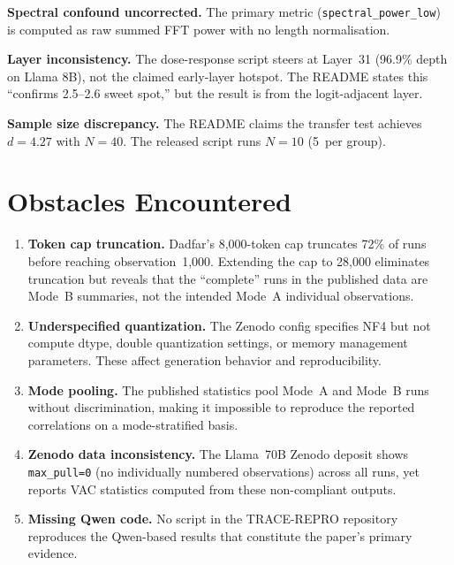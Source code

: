 \documentclass[11pt]{article}
\begin{document}
\textbf{Spectral confound uncorrected.} The primary metric
(\texttt{spectral\_power\_low}) is computed as raw summed FFT power
with no length normalisation.

\textbf{Layer inconsistency.} The dose-response script steers at
Layer~31 (96.9\% depth on Llama 8B), not the claimed early-layer
hotspot. The README states this ``confirms 2.5--2.6 sweet spot,'' but
the result is from the logit-adjacent layer.

\textbf{Sample size discrepancy.} The README claims the transfer test
achieves $d = 4.27$ with $N = 40$. The released script runs $N = 10$
(5~per group).


\section{Obstacles Encountered}

\begin{enumerate}
  \item \textbf{Token cap truncation.} Dadfar's 8,000-token cap
    truncates 72\% of runs before reaching observation~1,000. Extending
    the cap to 28,000 eliminates truncation but reveals that the
    ``complete'' runs in the published data are Mode~B summaries, not
    the intended Mode~A individual observations.

  \item \textbf{Underspecified quantization.} The Zenodo config
    specifies NF4 but not compute dtype, double quantization settings,
    or memory management parameters. These affect generation behavior
    and reproducibility.

  \item \textbf{Mode pooling.} The published statistics pool Mode~A
    and Mode~B runs without discrimination, making it impossible to
    reproduce the reported correlations on a mode-stratified basis.

  \item \textbf{Zenodo data inconsistency.} The Llama~70B Zenodo
    deposit shows \texttt{max\_pull=0} (no individually numbered
    observations) across all runs, yet reports VAC statistics computed
    from these non-compliant outputs.

  \item \textbf{Missing Qwen code.} No script in the TRACE-REPRO
    repository reproduces the Qwen-based results that constitute the
    paper's primary evidence.
\end{enumerate}
\end{document}
